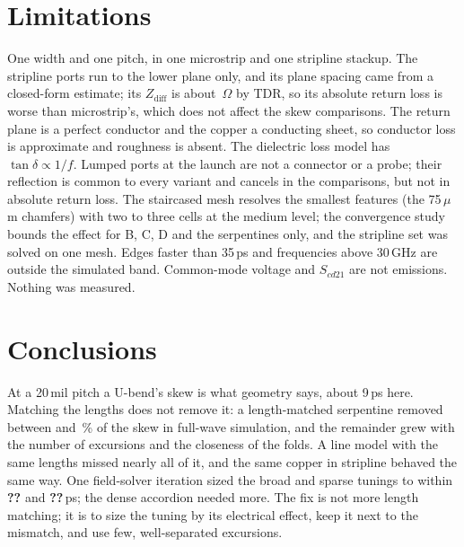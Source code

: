 \documentclass[10pt,twocolumn]{article}
\newcommand{\Missing}{\textbf{??}}
\providecommand{\SkewCcal}{\Missing}
\providecommand{\SkewFcal}{\Missing}
\newcommand{\Scd}[1]{S_{cd#1}}
\begin{document}
\section{Limitations}
\label{sec:limitations}

One width and one pitch, in one microstrip and one stripline stackup. The stripline ports run to the lower
plane only, and its plane spacing came from a closed-form estimate; its $Z_\mathrm{diff}$ is about
\ZmaxBsl\,$\Omega$ by TDR, so its absolute return loss is worse than microstrip's, which does not affect the
skew comparisons. The return plane is a perfect conductor and the copper a
conducting sheet, so conductor loss is approximate and roughness is absent. The dielectric loss model has
$\tan\delta \propto 1/f$. Lumped ports at the launch are not a connector or a probe; their reflection is common to
every variant and cancels in the comparisons, but not in absolute return loss. The staircased mesh resolves the
smallest features (the 75\,$\mu$m chamfers) with two to three cells at the medium level; the convergence study
bounds the effect for B, C, D and the serpentines only, and the stripline set was solved on one mesh. Edges faster than 35\,ps and frequencies above 30\,GHz are outside the
simulated band. Common-mode voltage and $\Scd{21}$ are not emissions. Nothing was measured.

\section{Conclusions}

At a 20\,mil pitch a U-bend's skew is what geometry says, about 9\,ps here. Matching the lengths does not remove
it: a length-matched serpentine removed between \RemovedPctD{} and \RemovedPctF\,\% of the skew in full-wave
simulation, and the
remainder grew with the number of excursions and the closeness of the folds. A line model with the same lengths
missed nearly all of it, and the same copper in stripline behaved the same way. One field-solver iteration sized
the broad and sparse tunings to within \SkewFcal{} and \SkewCcal\,ps; the dense accordion needed more. The fix is not more length matching; it is to size the tuning by its electrical effect,
keep it next to the mismatch, and use few, well-separated excursions.

\small
\raggedright


\end{document}
